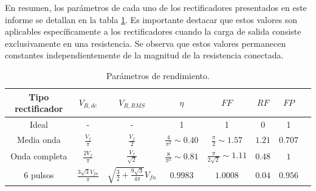 \documentclass[isoft]{ssltexposter}
\begin{document}
\begin{poster}
En resumen, los parámetros de cada uno de los rectificadores presentados en este informe se detallan en la tabla \ref{tab:rectificadores}. Es importante destacar que estos valores son aplicables específicamente a los rectificadores cuando la carga de salida consiste exclusivamente en una resistencia. Se observa que estos valores permanecen constantes independientemente de la magnitud de la resistencia conectada.

\vspace{0.3in}


\begin{table}
    \centering
    \begin{tabular}{|c|c|c|c|c|c|c|c|} \toprule
       \rowcolor{MediumBlue}\color{white}Tipo rectificador & \color{white} $V_{R,dc}$ & \color{white} $V_{R,RMS}$& \color{white} $\eta$& \color{white} $FF$ & \color{white} $RF$ & \color{white} $FP$\\ \midrule
         Ideal &-&-&1&1&0&1 \\
         Media onda& $\frac{V_f}{\pi}$& $\frac{V_f}{2}$& $\frac{4}{\pi^2}\sim 0.40$ &$\frac{\pi}{2}\sim 1.57$ & $1.21$ &  $0.707$ \\
         Onda completa& $\frac{2V_f}{\pi}$ & $\frac{V_f}{\sqrt{2}}$ & $\frac{8}{\pi^2}\sim 0.81$& $\frac{\pi}{2\sqrt{2}}\sim 1.11$ & $0.48$& $1$  \\  
         6 pulsos&$\frac{3\sqrt{3}V_{fn}}{\pi}$& $\sqrt{\frac{3}{2}+\frac{9\sqrt{3}}{4\pi}}V_{fn}$& $0.9983$ & $1.0008$& $0.04$& $0.956$ \\  \bottomrule
    \end{tabular}
    \caption{Parámetros de rendimiento.}
    \label{tab:rectificadores}
\end{table}


 

    

\end{poster}
\end{document}
